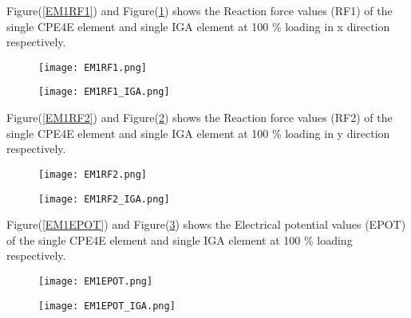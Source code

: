\documentclass[11pt]{article}
\begin{document}
\newpage

Figure(\ref{EM1RF1}) and Figure(\ref{EM1RF1_IGA}) shows the Reaction force values (RF1) of the single CPE4E element and single IGA element at 100 \% loading in x direction respectively. \\
\begin{figure}[H]
	\centering
	\begin{minipage}{.5\textwidth}
		\centering
		\texttt{[image: EM1RF1.png]}
		\label{EM1RF1}
	\end{minipage}%
	\begin{minipage}{.5\textwidth}
		\centering
		\texttt{[image: EM1RF1\_IGA.png]}
		\label{EM1RF1_IGA}
	\end{minipage}
\end{figure}
Figure(\ref{EM1RF2}) and Figure(\ref{EM1RF2_IGA}) shows the Reaction force values (RF2) of the single CPE4E element and single IGA element at 100 \% loading in y direction respectively. \\
\begin{figure}[H]
	\centering
	\begin{minipage}{.5\textwidth}
		\centering
		\texttt{[image: EM1RF2.png]}
		\label{EM1RF2}
	\end{minipage}%
	\begin{minipage}{.5\textwidth}
		\centering
		\texttt{[image: EM1RF2\_IGA.png]}
		\label{EM1RF2_IGA}
	\end{minipage}
\end{figure}

\newpage

Figure(\ref{EM1EPOT}) and Figure(\ref{EM1EPOT_IGA}) shows the Electrical potential values (EPOT) of the single CPE4E element and single IGA element at 100 \% loading respectively. \\
\begin{figure}[H]
	\centering
	\begin{minipage}{.5\textwidth}
		\centering
		\texttt{[image: EM1EPOT.png]}
		\label{EM1EPOT}
	\end{minipage}%
	\begin{minipage}{.5\textwidth}
		\centering
		\texttt{[image: EM1EPOT\_IGA.png]}
		\label{EM1EPOT_IGA}
	\end{minipage}
\end{figure}
\end{document}
